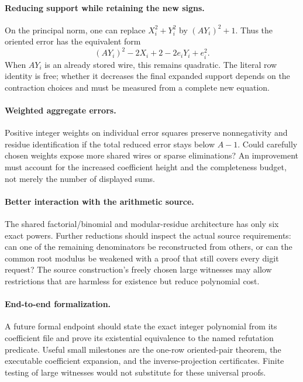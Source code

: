 \documentclass[11pt]{article}
\theoremstyle{remark}\newtheorem{remark}[theorem]{Remark}
\begin{document}
\paragraph{Reducing support while retaining the new signs.}
On the principal norm, one can replace $X_i^2+Y_i^2$ by $(AY_i)^2+1$. Thus the oriented error has the equivalent form
\[
 (AY_i)^2-2X_i+2-2e_iY_i+e_i^2.
\]
When $AY_i$ is an already stored wire, this remains quadratic. The literal row identity is free; whether it decreases the final expanded support depends on the contraction choices and must be measured from a complete new equation.

\paragraph{Weighted aggregate errors.}
Positive integer weights on individual error squares preserve nonnegativity and residue identification if the total reduced error stays below $A-1$. Could carefully chosen weights expose more shared wires or sparse eliminations? An improvement must account for the increased coefficient height and the completeness budget, not merely the number of displayed sums.

\paragraph{Better interaction with the arithmetic source.}
The shared factorial/binomial and modular-residue architecture has only six exact powers. Further reductions should inspect the actual source requirements: can one of the remaining denominators be reconstructed from others, or can the common root modulus be weakened with a proof that still covers every digit request? The source construction's freely chosen large witnesses may allow restrictions that are harmless for existence but reduce polynomial cost.

\paragraph{End-to-end formalization.}
A future formal endpoint should state the exact integer polynomial from its coefficient file and prove its existential equivalence to the named refutation predicate. Useful small milestones are the one-row oriented-pair theorem, the executable coefficient expansion, and the inverse-projection certificates. Finite testing of large witnesses would not substitute for these universal proofs.
\end{document}
